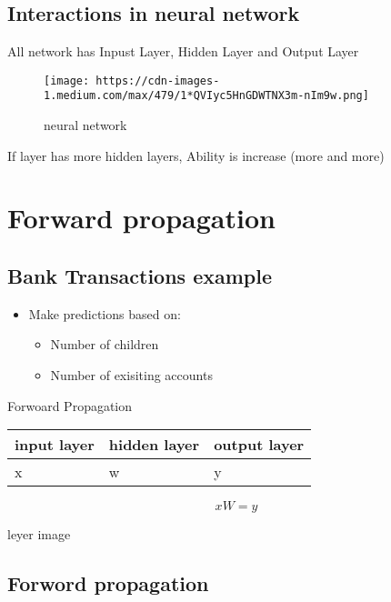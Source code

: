 \documentclass[11pt]{article}
\makeatletter
\def\maxwidth{\ifdim\Gin@nat@width>\linewidth\linewidth
    \else\Gin@nat@width\fi}
\let\Oldincludegraphics\includegraphics
\renewcommand{\includegraphics}[1]{\Oldincludegraphics[width=.8\maxwidth]{#1}}
\providecommand{\tightlist}{%
      \setlength{\itemsep}{0pt}\setlength{\parskip}{0pt}}
\makeatother
\begin{document}
    \subsection{Interactions in neural
network}\label{interactions-in-neural-network}

All network has Inpust Layer, Hidden Layer and Output Layer

\begin{figure}
\centering
\texttt{[image: https://cdn-images-1.medium.com/max/479/1*QVIyc5HnGDWTNX3m-nIm9w.png]}
\caption{neural network}
\end{figure}

    If layer has more hidden layers, Ability is increase (more and more)

    \section{Forward propagation}\label{forward-propagation}

    \subsection{Bank Transactions example}\label{bank-transactions-example}

    \begin{itemize}
\tightlist
\item
  Make predictions based on:

  \begin{itemize}
  \tightlist
  \item
    Number of children
  \item
    Number of exisiting accounts
  \end{itemize}
\end{itemize}

    Forwoard Propagation

\begin{longtable}[]{@{}lll@{}}
\toprule
input layer & hidden layer & output layer\tabularnewline
\midrule
\endhead
x & w & y\tabularnewline
\bottomrule
\end{longtable}

\[
xW=y
\]

    leyer image

    \subsection{Forword propagation}\label{forword-propagation}
\end{document}
